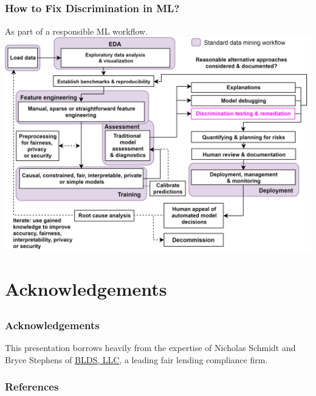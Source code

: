 \documentclass[11pt,
               		aspectratio=169,
               		hyperref={colorlinks}
               		]{beamer}
\begin{document}
		\subsection*{}
		\begin{frame}
			\frametitle{How to Fix Discrimination in ML?}		
			\centering
			As part of a responsible ML workflow.\\
			\vspace{10pt}
			{\includegraphics[scale=0.08]{img/blueprint.png}}
		\end{frame}		
	\section{Acknowledgements}
	\subsection*{}
	\begin{frame}
		\frametitle{Acknowledgements}
		This presentation borrows heavily from the expertise of Nicholas Schmidt and Bryce Stephens of \href{https://www.bldsllc.com/}{BLDS, LLC}, a leading fair lending compliance firm.
	\end{frame}	
	\begin{frame}[t, allowframebreaks]
		\frametitle{References}
		\printbibliography
	\end{frame}
\end{document}
